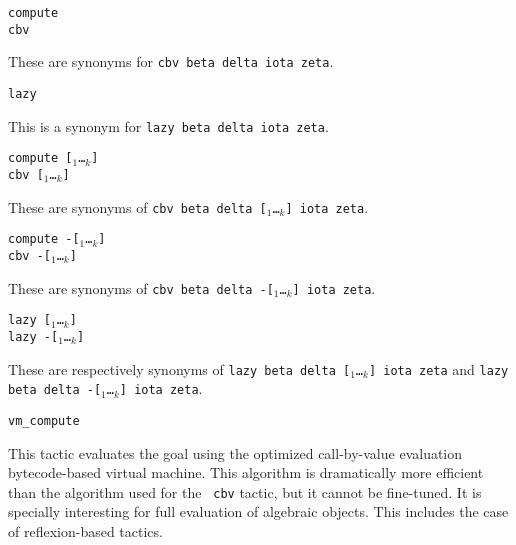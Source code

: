 \begin{coq_example*}
\begin{Variants}
\item {\tt compute} \\
      {\tt cbv}

  These are synonyms for {\tt cbv beta delta iota zeta}.

\item {\tt lazy}

  This is a synonym for {\tt lazy beta delta iota zeta}.

\item {\tt compute [\qualid$_1$\ldots\qualid$_k$]}\\
      {\tt cbv [\qualid$_1$\ldots\qualid$_k$]}

  These are synonyms of {\tt cbv beta delta
  [\qualid$_1$\ldots\qualid$_k$] iota zeta}.

\item {\tt compute -[\qualid$_1$\ldots\qualid$_k$]}\\
      {\tt cbv -[\qualid$_1$\ldots\qualid$_k$]}

  These are synonyms of {\tt cbv beta delta
  -[\qualid$_1$\ldots\qualid$_k$] iota zeta}.

\item {\tt lazy [\qualid$_1$\ldots\qualid$_k$]}\\
      {\tt lazy -[\qualid$_1$\ldots\qualid$_k$]}

  These are respectively synonyms of {\tt lazy beta delta
  [\qualid$_1$\ldots\qualid$_k$] iota zeta} and {\tt lazy beta delta
  -[\qualid$_1$\ldots\qualid$_k$] iota zeta}.

\item {\tt vm\_compute} 

  This tactic evaluates the goal using the optimized call-by-value
  evaluation bytecode-based virtual machine. This algorithm is
  dramatically more efficient than the algorithm used for the {\tt
  cbv} tactic, but it cannot be fine-tuned. It is specially
  interesting for full evaluation of algebraic objects. This includes
  the case of reflexion-based tactics.

\end{Variants}

%



\end{coq_example*}
